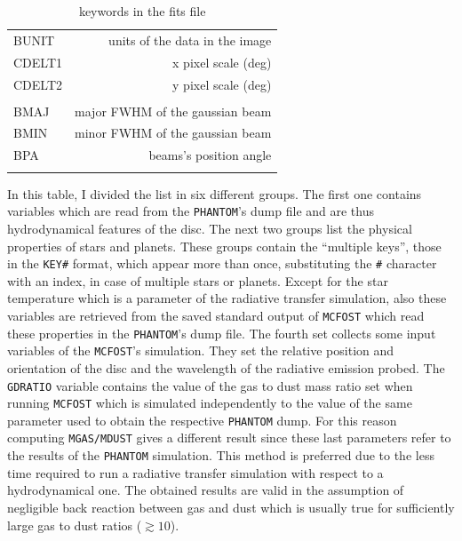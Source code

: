 \documentclass[a4paper,10pt]{report}
\begin{document}
\begin{table}
\begin{center}
\begin{tabular}{l r}
        BUNIT & units of the data in the image \\ 
        CDELT1 & x pixel scale (deg) \\
        CDELT2 & y pixel scale (deg)\\ \\
        
        BMAJ & major FWHM of the gaussian beam \\
        BMIN & minor FWHM of the gaussian beam\\
        BPA & beams's position angle \\ \\
        

         \bottomrule
        \end{tabular}
        \end{center}

        \caption{keywords in the fits file}
\end{table}

In this table, I divided the list in six different groups. The first one contains
variables which are read from the \lstinline{PHANTOM}'s dump file and are thus hydrodynamical features of
the disc. The next two groups list the physical properties of stars and planets. These groups contain the 
``multiple keys'', those in the \lstinline{KEY#} format, which appear more than once, substituting the \lstinline{#} character with an index,
in case of multiple stars or planets.
Except for the star temperature which is a parameter of the radiative transfer simulation, also these variables are retrieved from
the saved standard output of \lstinline{MCFOST} which read these properties in the \lstinline{PHANTOM}'s dump file.
The fourth set collects some input variables of the \lstinline{MCFOST}'s simulation.
They set the relative position and orientation of the disc and the wavelength of the radiative emission probed.
The \lstinline{GDRATIO} variable contains the value of the gas to dust mass ratio set when running \lstinline{MCFOST}
which is simulated
independently to the value of the same parameter used to obtain the respective \lstinline{PHANTOM} dump. For
this reason computing \lstinline{MGAS/MDUST} gives a different result since these last parameters refer to the results 
of the \lstinline{PHANTOM} simulation.
This method is preferred due to the less time required to run a radiative transfer simulation with respect to a
hydrodynamical one. The obtained results are valid in the assumption of negligible back reaction between gas and dust which
is usually true for sufficiently large gas to dust ratios ($\gtrsim 10$).
\end{document}
